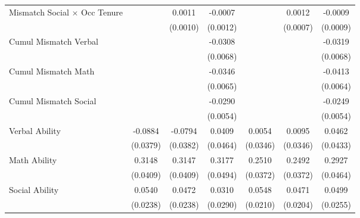 {\begin{longtable}{l*{6}{c}}
Mismatch Social $\times$ Occ Tenure&                     &      0.0011         &     -0.0007         &                     &      0.0012         &     -0.0009         \\
                    &                     &    (0.0010)         &    (0.0012)         &                     &    (0.0007)         &    (0.0009)         \\
Cumul Mismatch Verbal&                     &                     &     -0.0308\sym{***}&                     &                     &     -0.0319\sym{***}\\
                    &                     &                     &    (0.0068)         &                     &                     &    (0.0068)         \\
Cumul Mismatch Math &                     &                     &     -0.0346\sym{***}&                     &                     &     -0.0413\sym{***}\\
                    &                     &                     &    (0.0065)         &                     &                     &    (0.0064)         \\
Cumul Mismatch Social&                     &                     &     -0.0290\sym{***}&                     &                     &     -0.0249\sym{***}\\
                    &                     &                     &    (0.0054)         &                     &                     &    (0.0054)         \\
Verbal Ability      &     -0.0884\sym{**} &     -0.0794\sym{**} &      0.0409         &      0.0054         &      0.0095         &      0.0462         \\
                    &    (0.0379)         &    (0.0382)         &    (0.0464)         &    (0.0346)         &    (0.0346)         &    (0.0433)         \\
Math Ability        &      0.3148\sym{***}&      0.3147\sym{***}&      0.3177\sym{***}&      0.2510\sym{***}&      0.2492\sym{***}&      0.2927\sym{***}\\
                    &    (0.0409)         &    (0.0409)         &    (0.0494)         &    (0.0372)         &    (0.0372)         &    (0.0464)         \\
Social Ability      &      0.0540\sym{**} &      0.0472\sym{**} &      0.0310         &      0.0548\sym{***}&      0.0471\sym{**} &      0.0499\sym{*}  \\
                    &    (0.0238)         &    (0.0238)         &    (0.0290)         &    (0.0210)         &    (0.0204)         &    (0.0255)         \\

\end{longtable}}
